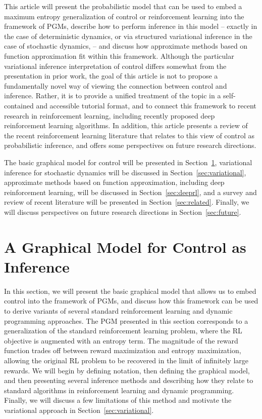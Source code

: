 This article will present the probabilistic model that can be used to embed a maximum entropy generalization of control or reinforcement learning into the framework of PGMs, describe how to perform inference in this model -- exactly in the case of deterministic dynamics, or via structured variational inference in the case of stochastic dynamics, -- and discuss how approximate methods based on function approximation fit within this framework. Although the particular variational inference interpretation of control differs somewhat from the presentation in prior work, the goal of this article is not to propose a fundamentally novel way of viewing the connection between control and inference. Rather, it is to provide a unified treatment of the topic in a self-contained and accessible tutorial format, and to connect this framework to recent research in reinforcement learning, including recently proposed deep reinforcement learning algorithms. In addition, this article presents a review of the recent reinforcement learning literature that relates to this view of control as probabilistic inference, and offers some perspectives on future research directions.

The basic graphical model for control will be presented in Section~\ref{sec:graphical_model}, variational inference for stochastic dynamics will be discussed in Section~\ref{sec:variational}, approximate methods based on function approximation, including deep reinforcement learning, will be discussed in Section~\ref{sec:deeprl}, and a survey and review of recent literature will be presented in Section~\ref{sec:related}. Finally, we will discuss perspectives on future research directions in Section~\ref{sec:future}.

\section{A Graphical Model for Control as Inference}
\label{sec:graphical_model}

In this section, we will present the basic graphical model that allows us to embed control into the framework of PGMs, and discuss how this framework can be used to derive variants of several standard reinforcement learning and dynamic programming approaches. The PGM presented in this section corresponds to a generalization of the standard reinforcement learning problem, where the RL objective is augmented with an entropy term. The magnitude of the reward function trades off between reward maximization and entropy maximization, allowing the original RL problem to be recovered in the limit of infinitely large rewards. We will begin by defining notation, then defining the graphical model, and then presenting several inference methods and describing how they relate to standard algorithms in reinforcement learning and dynamic programming. Finally, we will discuss a few limitations of this method and motivate the variational approach in Section~\ref{sec:variational}.

